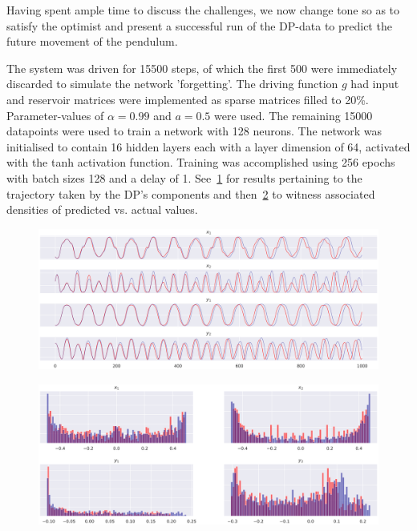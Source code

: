 \documentclass[a4paper,12pt,twoside]{report}
\begin{document}
Having spent ample time to discuss the challenges, we now change tone so as to satisfy the optimist and present a successful run of the DP-data to predict the future movement of the pendulum.

The system was driven for 15500 steps, of which the first 500 were immediately discarded to simulate the network 'forgetting'. The driving function $g$ had input and reservoir matrices were implemented as sparse matrices filled to 20\%. Parameter-values of $\alpha=0.99$ and $a=0.5$ were used.
The remaining 15000 datapoints were used to train a network with 128 neurons. 
The network was initialised to contain 16 hidden layers each with a layer dimension of 64, activated with the tanh activation function.
Training was accomplished using 256 epochs with batch sizes 128 and a delay of 1. See~\ref{fig:dp_success_traj} for results pertaining to the trajectory taken by the DP's components and then~\ref{fig:dp_success_density} to witness associated densities of predicted vs. actual values.


\begin{figure}[ht]
  \centering
  \includegraphics[width=0.95\linewidth]{_dp_success_4coords_traj.eps} 
  \label{fig:dp_success_traj}
\end{figure}
\begin{figure}[ht]
  \centering
  \includegraphics[width=\linewidth]{_dp_success_4coords_hist.eps}
  \label{fig:dp_success_density}
 \end{figure}
  
\end{document}
